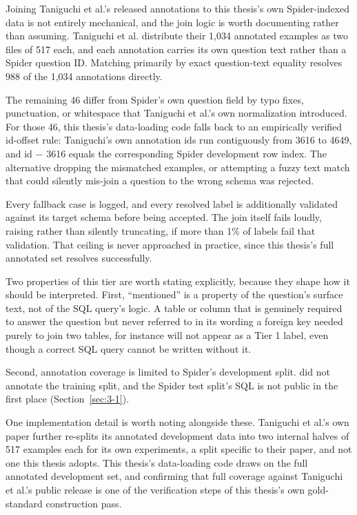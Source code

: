 Joining Taniguchi et al.'s released annotations to this thesis's own Spider-indexed data is not entirely mechanical, and the join logic is worth documenting rather than assuming. Taniguchi et al. distribute their 1,034 annotated examples as two files of 517 each, and each annotation carries its own question text rather than a Spider question ID. Matching primarily by exact question-text equality resolves 988 of the 1,034 annotations directly.

The remaining 46 differ from Spider's own question field by typo fixes, punctuation, or whitespace that Taniguchi et al.'s own normalization introduced. For those 46, this thesis's data-loading code falls back to an empirically verified id-offset rule: Taniguchi's own annotation ids run contiguously from 3616 to 4649, and id \ensuremath{-} 3616 equals the corresponding Spider development row index. The alternative dropping the mismatched examples, or attempting a fuzzy text match that could silently mis-join a question to the wrong schema was rejected.

Every fallback case is logged, and every resolved label is additionally validated against its target schema before being accepted. The join itself fails loudly, raising rather than silently truncating, if more than 1\% of labels fail that validation. That ceiling is never approached in practice, since this thesis's full annotated set resolves successfully.

Two properties of this tier are worth stating explicitly, because they shape how it should be interpreted. First, ``mentioned'' is a property of the question's surface text, not of the SQL query's logic. A table or column that is genuinely required to answer the question but never referred to in its wording a foreign key needed purely to join two tables, for instance will not appear as a Tier 1 label, even though a correct SQL query cannot be written without it.

Second, annotation coverage is limited to Spider's development split. \citet{taniguchi2021} did not annotate the training split, and the Spider test split's SQL is not public in the first place (Section~\ref{sec:3-1}).

One implementation detail is worth noting alongside these. Taniguchi et al.'s own paper further re-splits its annotated development data into two internal halves of 517 examples each for its own experiments, a split specific to their paper, and not one this thesis adopts. This thesis's data-loading code draws on the full annotated development set, and confirming that full coverage against Taniguchi et al.'s public release is one of the verification steps of this thesis's own gold-standard construction pass.

